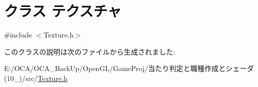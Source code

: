 \hypertarget{class_xE3_x83_x86_xE3_x82_xAF_xE3_x82_xB9_xE3_x83_x81_xE3_x83_xA3}{\section{クラス テクスチャ}
\label{class_xE3_x83_x86_xE3_x82_xAF_xE3_x82_xB9_xE3_x83_x81_xE3_x83_xA3}
}


{\ttfamily \#include $<$Texture.\-h$>$}



このクラスの説明は次のファイルから生成されました\-:\begin{DoxyCompactItemize}
\item 
E\-:/\-O\-C\-A/\-O\-C\-A\-\_\-\-Back\-Up/\-Open\-G\-L/\-Game\-Proj/当たり判定と職種作成とシェーダ(10\-\_)/src/\hyperlink{_texture_8h}{Texture.\-h}\end{DoxyCompactItemize}
